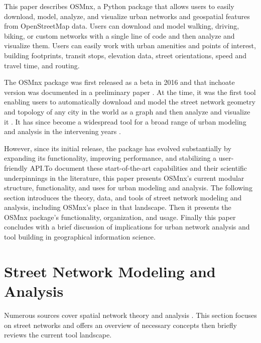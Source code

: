 \documentclass[12pt,letterpaper]{article} %
\begin{document}
This paper describes OSMnx, a Python package that allows users to easily download, model, analyze, and visualize urban networks and geospatial features from OpenStreetMap data. Users can download and model walking, driving, biking, or custom networks with a single line of code and then analyze and visualize them. Users can easily work with urban amenities and points of interest, building footprints, transit stops, elevation data, street orientations, speed and travel time, and routing.

The OSMnx package was first released as a beta in 2016 and that inchoate version was documented in a preliminary paper \citep{boeing_osmnx:_2017}. At the time, it was the first tool enabling users to automatically download and model the street network geometry and topology of any city in the world as a graph and then analyze and visualize it \citep{boeing_right_2020}. It has since become a widespread tool for a broad range of urban modeling and analysis in the intervening years \citep[e.g.,][]{coutrot_entropy_2022,dacci_signature_2019,feng_spatial_2020,gervasoni_calculating_2017,liao_disparities_2020,natera_orozco_data-driven_2020,yin_multi-task_2020,young_automatic_2020}.

However, since its initial release, the package has evolved substantially by expanding its functionality, improving performance, and stabilizing a user-friendly API.\@ To document these start-of-the-art capabilities and their scientific underpinnings in the literature, this paper presents OSMnx's current modular structure, functionality, and uses for urban modeling and analysis. The following section introduces the theory, data, and tools of street network modeling and analysis, including OSMnx's place in that landscape. Then it presents the OSMnx package's functionality, organization, and usage. Finally this paper concludes with a brief discussion of implications for urban network analysis and tool building in geographical information science.

\section{Street Network Modeling and Analysis}

Numerous sources cover spatial network theory and analysis \citep[e.g.,][]{tinkler_graph_1979,barnes_graph_1983,gastner_spatial_2006,barthelemy_spatial_2011,ducruet_spatial_2014,fischer_spatial_2014,marshall_street_2018}. This section focuses on street networks and offers an overview of necessary concepts then briefly reviews the current tool landscape.
\end{document}
